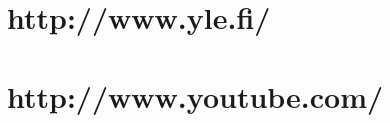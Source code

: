 \documentclass{article}
\begin{document}


\section{http://www.yle.fi/}














\section{http://www.youtube.com/}













\end{document}

